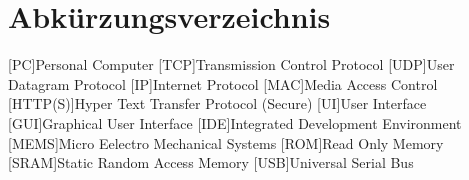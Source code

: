 \chapter*{Abkürzungsverzeichnis}
\begin{acronym}
    [PC]{Personal Computer}
    [TCP]{Transmission Control Protocol}
    [UDP]{User Datagram Protocol}
    [IP]{Internet Protocol}
    [MAC]{Media Access Control}
    [HTTP(S)]{Hyper Text Transfer Protocol (Secure)}
    [UI]{User Interface}
    [GUI]{Graphical User Interface}
    [IDE]{Integrated Development Environment}
    [MEMS]{Micro Eelectro Mechanical Systems}
    [ROM]{Read Only Memory}
    [SRAM]{Static Random Access Memory}
    [USB]{Universal Serial Bus}
\end{acronym}